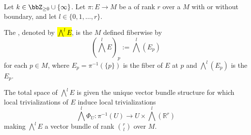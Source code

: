 \begin{definition} \label{definition:exterior_power_of_a_vector_bundle_on_a_topological_manifold}
Let $k \in \bbZ_{\geq 0} \cup \{\infty\}$. Let $\pi : E \to M$ be a  of rank $r$ over a  $M$ with or without boundary, and let $l \in \{0,1,\ldots,r\}.$

The , denoted by \hl{$\bigwedge^l E$}, is the  $M$ defined fiberwise by
$$ (\bigwedge^l E)_p := \bigwedge^l (E_p) $$
for each $p \in M$, where $E_p = \pi^{-1}(\{p\})$ is the fiber of $E$ at $p$ and $\bigwedge^l (E_p)$ is the  $E_p$.

The total space of $\bigwedge^l E$ is given the unique vector bundle structure for which local trivializations of $E$ induce local trivializations
$$ \bigwedge^l \Phi_U : \pi^{-1}(U) \to U \times \bigwedge^l(\mathbb{R}^r) $$
making $\bigwedge^l E$ a vector bundle of rank $\binom{r}{l}$ over $M$.
\end{definition}